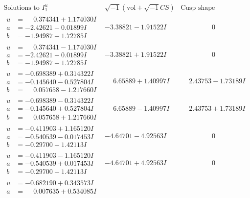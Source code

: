 \documentclass[1p]{elsarticle_modified}
\theoremstyle{definition}
\newcommand{\I}{\sqrt{-1}}
\begin{document}
$$\begin{array}{c|c|c}
\text{Solutions to }I^u_{1}& \I (\text{vol} + \sqrt{-1}CS) & \text{Cusp shape}\\
 \hline 
\begin{aligned}
u &= \phantom{-}0.374341 + 1.174030 I \\
a &= -2.42621 + 0.01899 I \\
b &= -1.94987 + 1.72785 I\end{aligned}
 & -3.38821 - 1.91522 I & \phantom{-0.000000 } 0 \\ \hline\begin{aligned}
u &= \phantom{-}0.374341 - 1.174030 I \\
a &= -2.42621 - 0.01899 I \\
b &= -1.94987 - 1.72785 I\end{aligned}
 & -3.38821 + 1.91522 I & \phantom{-0.000000 } 0 \\ \hline\begin{aligned}
u &= -0.698389 + 0.314322 I \\
a &= -0.145640 - 0.527804 I \\
b &= \phantom{-}0.057658 - 1.217660 I\end{aligned}
 & \phantom{-}6.65889 + 1.40997 I & \phantom{-}2.43753 - 1.73189 I \\ \hline\begin{aligned}
u &= -0.698389 - 0.314322 I \\
a &= -0.145640 + 0.527804 I \\
b &= \phantom{-}0.057658 + 1.217660 I\end{aligned}
 & \phantom{-}6.65889 - 1.40997 I & \phantom{-}2.43753 + 1.73189 I \\ \hline\begin{aligned}
u &= -0.411903 + 1.165120 I \\
a &= -0.540539 - 0.017453 I \\
b &= -0.29700 - 1.42113 I\end{aligned}
 & -4.64701 - 4.92563 I & \phantom{-0.000000 } 0 \\ \hline\begin{aligned}
u &= -0.411903 - 1.165120 I \\
a &= -0.540539 + 0.017453 I \\
b &= -0.29700 + 1.42113 I\end{aligned}
 & -4.64701 + 4.92563 I & \phantom{-0.000000 } 0 \\ \hline\begin{aligned}
u &= -0.682190 + 0.343573 I \\
a &= \phantom{-}0.007635 + 0.534085 I \\

\end{aligned}
\end{array}$$
\end{document}
